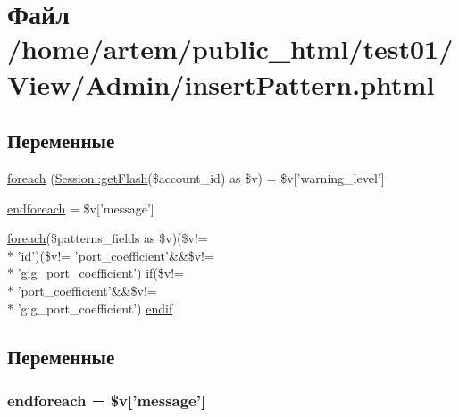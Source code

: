 \hypertarget{insert_pattern_8phtml}{\section{Файл /home/artem/public\-\_\-html/test01/\-View/\-Admin/insert\-Pattern.phtml}
\label{insert_pattern_8phtml}
}
\subsection*{Переменные}
\begin{DoxyCompactItemize}
\item 
\hyperlink{insert_pattern_8phtml_a1c191ff1be2612f80eabc75951f1841b}{foreach} (\hyperlink{class_session_ae4c4b98671bdd1fbfe4ae9defb5405ad}{Session\-::get\-Flash}(\$account\-\_\-id) as \$v) = \$v\mbox{[}'warning\-\_\-level'\mbox{]}
\item 
\hyperlink{insert_pattern_8phtml_a672d9707ef91db026c210f98cc601123}{endforeach} = \$v\mbox{[}'message'\mbox{]}
\item 
\hyperlink{snmp_switch_data_8phtml_a1aebcd3bfc8b09c505928fe2958e6143}{foreach}(\$patterns\-\_\-fields as \$v)(\$v!= \\*
'id')(\$v!= 'port\-\_\-coefficient'\&\&\$v!= \\*
'gig\-\_\-port\-\_\-coefficient') if(\$v!= \\*
'port\-\_\-coefficient'\&\&\$v!= \\*
'gig\-\_\-port\-\_\-coefficient') \hyperlink{insert_pattern_8phtml_afd53a91464451c8aabda435ff44bd275}{endif}
\end{DoxyCompactItemize}


\subsection{Переменные}
\hypertarget{insert_pattern_8phtml_a672d9707ef91db026c210f98cc601123}{
\subsubsection[{endforeach}]{\setlength{\rightskip}{0pt plus 5cm}endforeach = \$v\mbox{[}'message'\mbox{]}}}\label{insert_pattern_8phtml_a672d9707ef91db026c210f98cc601123}


